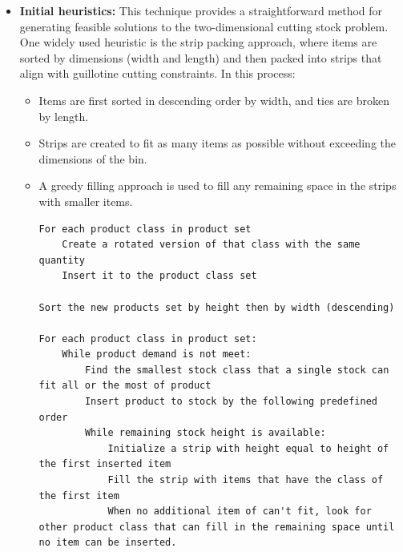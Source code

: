 \documentclass[a4paper]{article}
\begin{document}
\begin{itemize}
    \item \textbf{Initial heuristics:} This technique provides a straightforward method for generating feasible solutions to the two-dimensional cutting stock problem. One widely used heuristic is the strip packing approach, where items are sorted by dimensions (width and length) and then packed into strips that align with guillotine cutting constraints. In this process:
\begin{itemize}     
    \item Items are first sorted in descending order by width, and ties are broken by length.     
    \item Strips are created to fit as many items as possible without exceeding the dimensions of the bin.      
    \item A greedy filling approach is used to fill any remaining space in the strips with smaller items. 
        
\begin{verbatim}
For each product class in product set
	Create a rotated version of that class with the same quantity
	Insert it to the product class set

Sort the new products set by height then by width (descending)

For each product class in product set:
	While product demand is not meet:
		Find the smallest stock class that a single stock can fit all or the most of product
		Insert product to stock by the following predefined order
		While remaining stock height is available:
			Initialize a strip with height equal to height of the first inserted item
			Fill the strip with items that have the class of the first item
			When no additional item of can't fit, look for other product class that can fill in the remaining space until no item can be inserted.
\end{verbatim}
\end{itemize}


\end{itemize}
\end{document}
